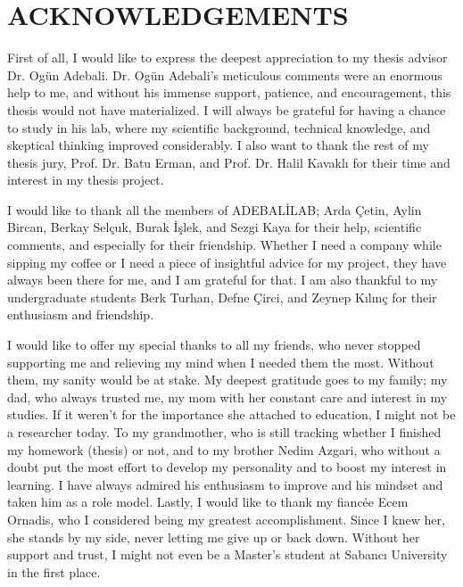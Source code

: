 \setlength{\parindent}{0pt}
\chapter*{\vspace{-4\baselineskip} \bf ACKNOWLEDGEMENTS}

First of all, I would like to express the deepest appreciation to my thesis advisor Dr. Ogün Adebali. Dr. Ogün Adebali's meticulous comments were an enormous help to me, and without his immense support, patience, and encouragement, this thesis would not have materialized. I will always be grateful for having a chance to study in his lab, where my scientific background, technical knowledge, and skeptical thinking improved considerably. I also want to thank the rest of my thesis jury, Prof. Dr. Batu Erman, and Prof. Dr. Halil Kavaklı for their time and interest in my thesis project. 

I would like to thank all the members of ADEBALİLAB; Arda Çetin, Aylin Bircan, Berkay Selçuk, Burak İşlek, and Sezgi Kaya for their help, scientific comments, and especially for their friendship. Whether I need a company while sipping my coffee or I need a piece of insightful advice for my project, they have always been there for me, and I am grateful for that. I am also thankful to my undergraduate students Berk Turhan, Defne Çirci, and Zeynep Kılınç for their enthusiasm and friendship.

I would like to offer my special thanks to all my friends, who never stopped supporting me and relieving my mind when I needed them the most. Without them, my sanity would be at stake. My deepest gratitude goes to my family; my dad, who always trusted me, my mom with her constant care and interest in my studies. If it weren't for the importance she attached to education, I might not be a researcher today. To my grandmother, who is still tracking whether I finished my homework (thesis) or not, and to my brother Nedim Azgari, who without a doubt put the most effort to develop my personality and to boost my interest in learning. I have always admired his enthusiasm to improve and his mindset and taken him as a role model. Lastly, I would like to thank my fiancée Ecem Ornadis, who I considered being my greatest accomplishment. Since I knew her, she stands by my side, never letting me give up or back down. Without her support and trust, I might not even be a Master's student at Sabancı University in the first place.    

\clearpage\pagebreak